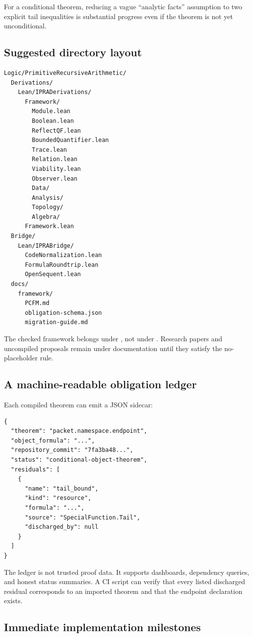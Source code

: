 For a conditional theorem, reducing a vague ``analytic facts'' assumption to
two explicit tail inequalities is substantial progress even if the theorem is
not yet unconditional.

\subsection{Suggested directory layout}

\begin{lstlisting}[language={}]
Logic/PrimitiveRecursiveArithmetic/
  Derivations/
    Lean/IPRADerivations/
      Framework/
        Module.lean
        Boolean.lean
        ReflectQF.lean
        BoundedQuantifier.lean
        Trace.lean
        Relation.lean
        Viability.lean
        Observer.lean
        Data/
        Analysis/
        Topology/
        Algebra/
      Framework.lean
  Bridge/
    Lean/IPRABridge/
      CodeNormalization.lean
      FormulaRoundtrip.lean
      OpenSequent.lean
  docs/
    framework/
      PCFM.md
      obligation-schema.json
      migration-guide.md
\end{lstlisting}

The checked framework belongs under , not under
.  Research papers and uncompiled proposals remain under
documentation until they satisfy the no-placeholder rule.

\subsection{A machine-readable obligation ledger}

Each compiled theorem can emit a JSON sidecar:
\begin{lstlisting}[language={}]
{
  "theorem": "packet.namespace.endpoint",
  "object_formula": "...",
  "repository_commit": "7fa3ba48...",
  "status": "conditional-object-theorem",
  "residuals": [
    {
      "name": "tail_bound",
      "kind": "resource",
      "formula": "...",
      "source": "SpecialFunction.Tail",
      "discharged_by": null
    }
  ]
}
\end{lstlisting}

The ledger is not trusted proof data.  It supports dashboards, dependency
queries, and honest status summaries.  A CI script can verify that every
listed discharged residual corresponds to an imported theorem and that the
endpoint declaration exists.

\subsection{Immediate implementation milestones}

